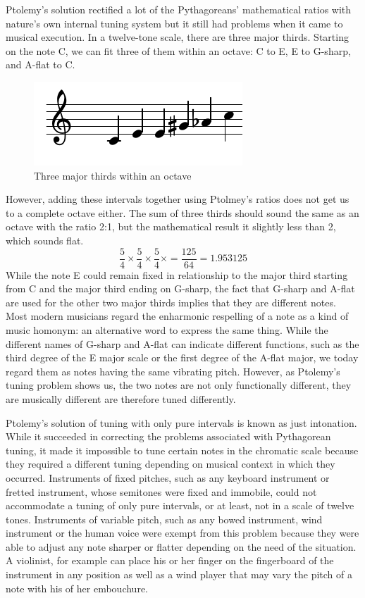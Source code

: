 Ptolemy's solution rectified a lot of the Pythagoreans' mathematical
ratios with nature's own internal tuning system but it still had problems when it came to
musical execution.  In a twelve-tone scale, there are three major thirds. Starting
on the note C, we can fit three of them within an octave:
C to E, E to G-sharp, and A-flat to C.
\begin{figure}[h]
\centering
\includegraphics{examples/thirds.pdf}
\caption{Three major thirds within an octave}
\end{figure}
However, adding these intervals together using Ptolmey's
ratios does not get us to a complete octave either.  The sum of three thirds should sound
the same as an octave with the ratio 2:1, but the mathematical result it slightly less than
2, which sounds flat.
\begin{equation}
    \frac{5}{4} \times
    \frac{5}{4} \times
    \frac{5}{4} \times = \frac{125}{64} = 1.953125
\end{equation}
While the note E could remain fixed in relationship to the major third starting
from C and the major third ending on G-sharp, the fact that G-sharp and A-flat
are used for the other two major thirds implies that they are different notes.
Most modern musicians regard the enharmonic respelling of a note as a kind of
music homonym: an alternative word to express the same thing.  While the
different names of G-sharp and A-flat can indicate different functions, such as
the third degree of the E major scale or the first degree of the A-flat major,
we today regard them as notes having the same vibrating pitch.
However, as Ptolemy's tuning problem shows us, the two notes are not only
functionally different, they are musically different are therefore tuned differently.

Ptolemy's solution of tuning with only pure intervals is known as just intonation.  While
it succeeded in correcting the problems associated with Pythagorean tuning, it made it impossible
to tune certain notes in the chromatic scale because they required a different tuning depending on
musical context in which they occurred.  Instruments of fixed pitches,
such as any keyboard instrument or fretted instrument, whose semitones
were fixed and immobile, could not accommodate a tuning of only pure
intervals, or at least, not in a scale of twelve tones.  Instruments
of variable pitch, such as any bowed instrument, wind instrument or
the human voice were exempt from this problem because they were able
to adjust any note sharper or flatter depending on the need of the
situation.  A violinist, for example can place his or her finger
on the fingerboard of the instrument in any position as well as a
wind player that may vary the pitch of a note with his of her
embouchure.

